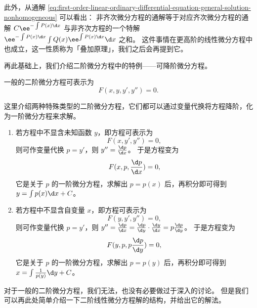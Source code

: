 此外，从通解 \cref{eq:first-order-linear-ordinary-differential-equation-general-solution-nonhomogeneous} 可以看出：
非齐次微分方程的通解等于对应齐次微分方程的通解 $ C \ee^{-\int P(x) \d x} $ 与非齐次方程的一个特解 $ \ee^{-\int P(x) \d x} \int Q(x) \ee^{\int P(x) \d x} \d x $ 之和。
这件事情在更高阶的线性微分方程中也成立，这一性质称为「叠加原理」，我们之后会再提到它。
\bigskip

再此基础上，我们介绍二阶微分方程中的特例——可降阶微分方程。

一般的二阶微分方程可表示为
\begin{equation}
    F(x, y, y', y'') = 0.
\end{equation}

这里介绍两种特殊类型的二阶微分方程，它们都可以通过变量代换将方程降阶，化为一阶微分方程来求解。
\begin{enumerate}
    \item 若方程中不显含未知函数 $ y $，即方程可表示为
          \begin{equation}
              F(x, y', y'') = 0,
          \end{equation}
          则可作变量代换 $ p = y' $，则 $ y'' = \frac{\d p}{\d x} $。
          于是方程变为
          \begin{equation}
              F(x, p, \frac{\d p}{\d x}) = 0,
          \end{equation}
          它是关于 $ p $ 的一阶微分方程，求解出 $ p = p(x) $ 后，再积分即可得到 $ y = \int p(x) \d x + C $。
    \item 若方程中不显含自变量 $ x $，即方程可表示为
          \begin{equation}
              F(y, y', y'') = 0,
          \end{equation}
          则可作变量代换 $ p = y' $，则 $ y'' = \frac{\d p}{\d x} = \frac{\d p}{\d y} \cdot \frac{\d y}{\d x} = p \frac{\d p}{\d y} $。
          于是方程变为
          \begin{equation}
              F(y, p, p \frac{\d p}{\d y}) = 0,
          \end{equation}
          它是关于 $ p $ 的一阶微分方程，求解出 $ p = p(y) $ 后，再积分即可得到 $ x = \int \frac{1}{p(y)} \d y + C $。
\end{enumerate}

\bigskip

对于一般的二阶微分方程，我们无法，也没有必要做过于深入的讨论。
但是我们可以再此处简单介绍一下二阶线性微分方程解的结构，并给出它的解法。


